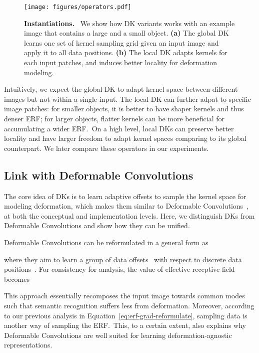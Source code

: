 \documentclass{article} \usepackage{iclr2020_conference, times}
\newcommand{\captiont}[2]{\caption{\textbf{#1} #2}}
\begin{document}
\begin{figure}[t]
    \centering
    \texttt{[image: figures/operators.pdf]}
    \captiont{Instantiations.}{\
        We show how DK variants works with an example image that contains a
        \textcolor{large}{large} and a \textcolor{small}{small} object.
        \textbf{(a)} The global DK learns one set of kernel sampling grid given
        an input image and apply it to all data positions.
        \textbf{(b)} The local DK adapts kernels for each input patches, and
        induces better locality for deformation modeling.
    }\vspace{-0.5em}
    \label{fig:operators}
\end{figure}

Intuitively, we expect the global DK to adapt kernel space between different
images but not within a single input.
The local DK can further adpat to specific image patches: for smaller objects,
it is better to have shaper kernels and thus denser ERF; for larger objects,
flatter kernels can be more beneficial for accumulating a wider ERF.\
On a high level, local DKs can preserve better locality and have larger freedom
to adapt kernel spaces comparing to its global counterpart.
We later compare these operators in our experiments.


\subsection{Link with Deformable Convolutions} \label{sec:dcn}
The core idea of DKs is to learn adaptive offsets to sample the kernel space for
modeling deformation, which makes them similar to Deformable
Convolutions~\citep{dai2017deformable,zhu2019deformable}, at both the conceptual and
implementation levels.
Here, we distinguish DKs from Deformable Convolutions and show how they can be unified.

Deformable Convolutions can be reformulated in a general form as

where they aim to learn a group of data offsets~
with respect to discrete data positions~.
For consistency for analysis, the value of effective receptive field becomes

This approach essentially recomposes the input image towards common modes such that
semantic recognition suffers less from deformation.
Moreover, according to our previous analysis in
Equation~\ref{eq:erf-grad-reformulate}, sampling data is another way of
sampling the ERF.\
This, to a certain extent, also explains why Deformable Convolutions are well
suited for learning deformation-agnostic representations.
\end{document}
